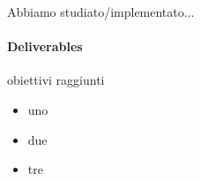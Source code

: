 Abbiamo studiato/implementato...
\paragraph{Deliverables} 
obiettivi raggiunti
\begin{itemize}
    \item uno
    \item due
    \item tre
\end{itemize}
